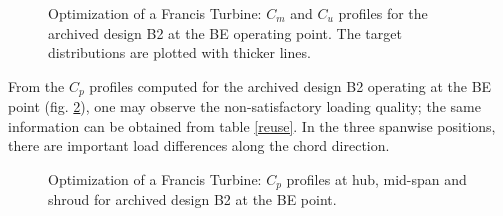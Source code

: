 \begin{figure}[h!]
\begin{minipage}[b]{1\linewidth}
 \centering
\end{minipage}
\caption{Optimization of a Francis Turbine: $C_m$ and $C_u$ profiles for the archived design B2 at the BE operating point. The target distributions are plotted with thicker lines.}
\label{Francis-B2-OUT}
\end{figure}

From the $C_p$ profiles computed for the archived design B2 operating at the BE point (fig. \ref{Francis-B2-LOAD}), one may observe the non-satisfactory loading quality; the same information can be obtained from table \ref{reuse}. In the three spanwise positions, there are important load differences along the chord direction. 

\begin{figure}[h!]
\begin{minipage}[b]{1\linewidth}
 \centering
\end{minipage}
\caption{Optimization of a Francis Turbine: $C_p$ profiles at hub, mid-span and shroud for archived design B2 at the BE point.}
\label{Francis-B2-LOAD}
\end{figure}


